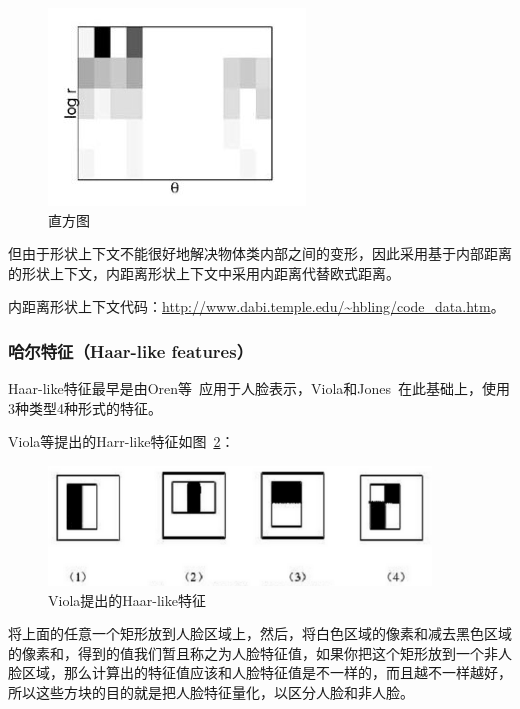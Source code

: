 \documentclass[12pt]{article}
\begin{document}
\begin{enumerate}
\begin{figure}
\begin{minipage}[t]{0.47\linewidth}
              \centering
              \includegraphics[width=0.6\linewidth]{his}
              \caption{直方图}
              \label{fig:his}
              \end{minipage}
            \end{figure}  
    \end{enumerate}
    但由于形状上下文不能很好地解决物体类内部之间的变形，因此采用基于内部距离的形状上下文\cite{ling2007shape}，内距离形状上下文中采用内距离代替欧式距离。
    
内距离形状上下文代码：\url{http://www.dabi.temple.edu/~hbling/code_data.htm}。



\subsubsection{哈尔特征（Haar-like features）}

Haar-like特征最早是由Oren等~\cite{oren1997pedestrian}应用于人脸表示，Viola和Jones~\cite{Rapid
object detection using boosted cascade of simple features}在此基础上，使用3种类型4种形式的特征。

Viola等提出的Harr-like特征如图~\ref{fig: Viola_Haar-like}：

\begin{figure}[!ht]
\centering
\includegraphics[width=4in]{Viola_Haar-like}
\caption{Viola提出的Haar-like特征}
\label{fig: Viola_Haar-like}
\end{figure}

将上面的任意一个矩形放到人脸区域上，然后，将白色区域的像素和减去黑色区域的像素和，得到的值我们暂且称之为人脸特征值，如果你把这个矩形放到一个非人脸区域，那么计算出的特征值应该和人脸特征值是不一样的，而且越不一样越好，所以这些方块的目的就是把人脸特征量化，以区分人脸和非人脸。
\end{document}
